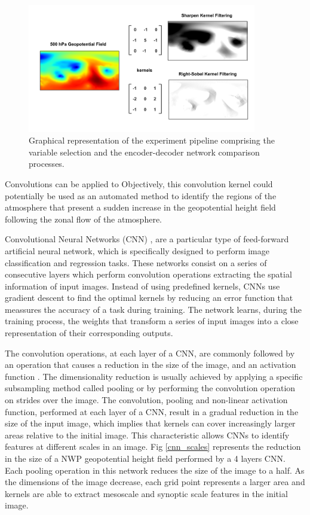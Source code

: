 \documentclass[twocol]{ametsoc}
\begin{document}
\begin{figure}[h]
 \centerline{\includegraphics[width=10cm]{kernels.png}}
  \caption{Graphical representation of the experiment pipeline comprising the variable selection and the encoder-decoder network comparison processes.}\label{kernels}
\end{figure}

Convolutions can be applied to Objectively, this convolution kernel could potentially be used as an automated method to identify the regions of the atmosphere that present a sudden increase in the geopotential height field following the zonal flow of the atmosphere.

Convolutional Neural Networks (CNN) \citep{lecun2010convolutional}, are a particular type of feed-forward artificial neural network, which is specifically designed to perform image classification and regression tasks. These networks consist on a series of consecutive layers which perform convolution operations extracting the spatial information of input images. Instead of using predefined kernels, CNNs use gradient descent \citep{bottou2010large} to find the optimal kernels by reducing an error function that meassures the accuracy of a task during training. The network learns, during the training process, the weights that transform a series of input images into a close representation of their corresponding outputs.

The convolution operations, at each layer of a CNN, are commonly followed by an operation that causes a reduction in the size of the image, and an activation function \citep{glorot2010understanding}. The dimensionality reduction is usually achieved by applying a specific subsampling method called pooling \citep{scherer2010evaluation} or by performing the convolution operation on strides over the image. The convolution, pooling and non-linear activation function, performed at each layer of a CNN, result in a gradual reduction in the size of the input image, which implies that kernels can cover increasingly larger areas relative to the initial image. This characteristic allows CNNs to identify features at different scales in an image. Fig \ref{cnn_scales} represents the reduction in the size of a NWP geopotential height field performed by a 4 layers CNN. Each pooling operation in this network reduces the size of the image to a half. As the dimensions of the image decrease, each grid point represents a larger area and kernels are able to extract mesoscale and synoptic scale features in the initial image. 
\end{document}
